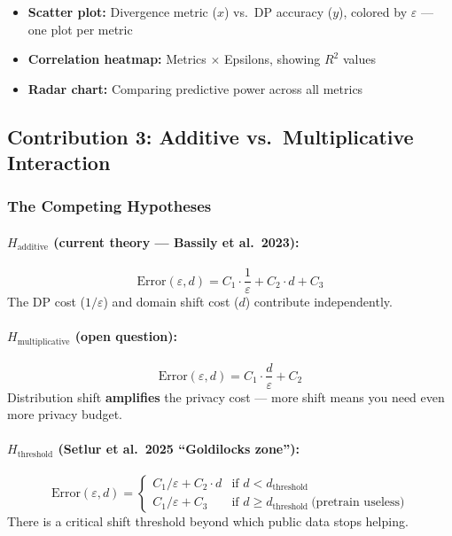 \documentclass[11pt,a4paper]{article}
\begin{document}
\begin{itemize}[nosep]
    \item \textbf{Scatter plot:} Divergence metric ($x$) vs.\ DP accuracy ($y$), colored by $\varepsilon$ --- one plot per metric
    \item \textbf{Correlation heatmap:} Metrics $\times$ Epsilons, showing $R^2$ values
    \item \textbf{Radar chart:} Comparing predictive power across all metrics
\end{itemize}

\subsection{Contribution 3: Additive vs.\ Multiplicative Interaction}

\subsubsection{The Competing Hypotheses}

\paragraph{$H_{\text{additive}}$ (current theory --- Bassily et al.\ 2023):}
\begin{equation}
    \text{Error}(\varepsilon, d) = C_1 \cdot \frac{1}{\varepsilon} + C_2 \cdot d + C_3
    \label{eq:additive}
\end{equation}
The DP cost ($1/\varepsilon$) and domain shift cost ($d$) contribute independently.

\paragraph{$H_{\text{multiplicative}}$ (open question):}
\begin{equation}
    \text{Error}(\varepsilon, d) = C_1 \cdot \frac{d}{\varepsilon} + C_2
    \label{eq:multiplicative}
\end{equation}
Distribution shift \textbf{amplifies} the privacy cost --- more shift means you need even more privacy budget.

\paragraph{$H_{\text{threshold}}$ (Setlur et al.\ 2025 ``Goldilocks zone''):}
\begin{equation}
    \text{Error}(\varepsilon, d) =
    \begin{cases}
        C_1/\varepsilon + C_2 \cdot d & \text{if } d < d_{\text{threshold}} \\
        C_1/\varepsilon + C_3 & \text{if } d \geq d_{\text{threshold}}\ \text{(pretrain useless)}
    \end{cases}
    \label{eq:threshold}
\end{equation}
There is a critical shift threshold beyond which public data stops helping.
\end{document}
